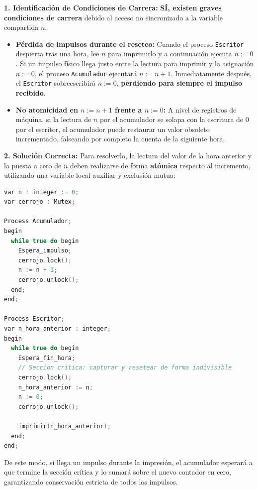\begin{solucion}
\textbf{1. Identificación de Condiciones de Carrera:}
\textbf{SÍ, existen graves condiciones de carrera} debido al acceso no sincronizado a la variable compartida $n$:
\begin{itemize}[leftmargin=*]
    \item \textbf{Pérdida de impulsos durante el reseteo:} Cuando el proceso \texttt{Escritor} despierta tras una hora, lee $n$ para imprimirlo y a continuación ejecuta $n := 0$. Si un impulso físico llega justo entre la lectura para imprimir y la asignación $n := 0$, el proceso \texttt{Acumulador} ejecutará $n := n + 1$. Inmediatamente después, el \texttt{Escritor} sobreescribirá $n := 0$, \textbf{perdiendo para siempre el impulso recibido}.
    \item \textbf{No atomicidad en $n := n + 1$ frente a $n := 0$:} A nivel de registros de máquina, si la lectura de $n$ por el acumulador se solapa con la escritura de 0 por el escritor, el acumulador puede restaurar un valor obsoleto incrementado, falseando por completo la cuenta de la siguiente hora.
\end{itemize}

\textbf{2. Solución Correcta:}
Para resolverlo, la lectura del valor de la hora anterior y la puesta a cero de $n$ deben realizarse de forma \textbf{atómica} respecto al incremento, utilizando una variable local auxiliar y exclusión mutua:

\begin{lstlisting}[language=C++]
var n : integer := 0;
var cerrojo : Mutex;

Process Acumulador;
begin
  while true do begin
    Espera_impulso;
    cerrojo.lock();
    n := n + 1;
    cerrojo.unlock();
  end;
end;

Process Escritor;
var n_hora_anterior : integer;
begin
  while true do begin
    Espera_fin_hora;
    // Seccion critica: capturar y resetear de forma indivisible
    cerrojo.lock();
    n_hora_anterior := n;
    n := 0;
    cerrojo.unlock();
    
    imprimir(n_hora_anterior);
  end;
end;
\end{lstlisting}
De este modo, si llega un impulso durante la impresión, el acumulador esperará a que termine la sección crítica y lo sumará sobre el nuevo contador en cero, garantizando conservación estricta de todos los impulsos.
\end{solucion}

